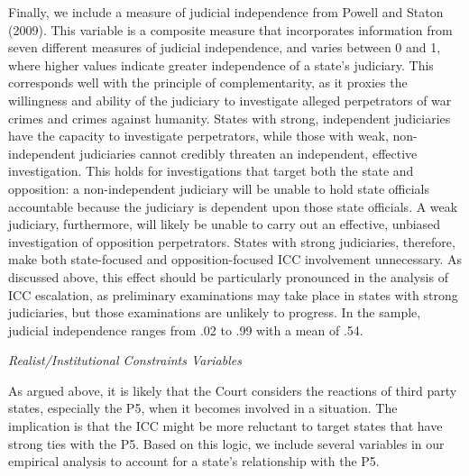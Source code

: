 Finally, we include a measure of judicial independence from Powell and Staton (2009). This variable is a composite measure that incorporates information from seven different measures of judicial independence, and varies between 0 and 1, where higher values indicate greater independence of a state's judiciary. This corresponds well with the principle of complementarity, as it proxies the willingness and ability of the judiciary to investigate alleged perpetrators of war crimes and crimes against humanity. States with strong, independent judiciaries have the capacity to investigate perpetrators, while those with weak, non-independent judiciaries cannot credibly threaten an independent, effective investigation. This holds for investigations that target both the state and opposition: a non-independent judiciary will be unable to hold state officials accountable because the judiciary is dependent upon those state officials. A weak judiciary, furthermore, will likely be unable to carry out an effective, unbiased investigation of opposition perpetrators. States with strong judiciaries, therefore, make both state-focused and opposition-focused ICC involvement unnecessary. As discussed above, this effect should be particularly pronounced in the analysis of ICC escalation, as preliminary examinations may take place in states with strong judiciaries, but those examinations are unlikely to progress. In the sample, judicial independence ranges from .02 to .99 with a mean of .54.

\emph{Realist/Institutional Constraints Variables}

As argued above, it is likely that the Court considers the reactions of third party states, especially the P5, when it becomes involved in a situation. The implication is that the ICC might be more reluctant to target states that have strong ties with the P5. Based on this logic, we include several variables in our empirical analysis to account for a state's relationship with the P5.

